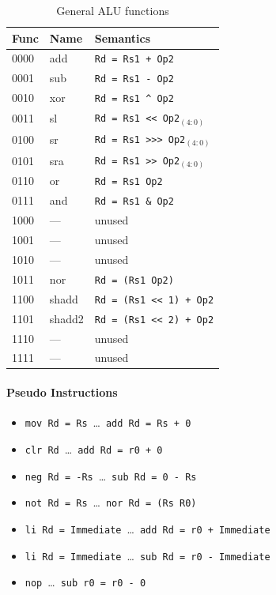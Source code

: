 \documentclass[a4paper,fontsize=10pt,twoside,DIV15,BCOR12mm,headinclude=true,footinclude=false,pagesize,bibtotoc]{scrbook}
\newcommand{\XOR}{\textasciicircum\xspace}
\newcommand{\OR}{\textbar\xspace}
\newcommand{\AND}{\&\xspace}
\newcommand{\NOT}{\texttildelow}
\newcommand{\shl}{\textless$\!$\textless\xspace}
\newcommand{\shr}{\textgreater$\!$\textgreater$\!$\textgreater\xspace}
\newcommand{\ashr}{\textgreater$\!$\textgreater\xspace}
\begin{document}
\begin{table}[hb]
  \centering
  \begin{tabular}{lll}
    \toprule
    Func & Name   & Semantics \\
    \midrule
    0000 & add    & \texttt{Rd = Rs1 + Op2} \\
    0001 & sub    & \texttt{Rd = Rs1 - Op2} \\
    0010 & xor    & \texttt{Rd = Rs1 \XOR Op2} \\
    0011 & sl     & \texttt{Rd = Rs1 \shl Op2$_{(4:0)}$} \\
    0100 & sr     & \texttt{Rd = Rs1 \shr Op2$_{(4:0)}$} \\
    0101 & sra    & \texttt{Rd = Rs1 \ashr Op2$_{(4:0)}$} \\
    0110 & or     & \texttt{Rd = Rs1 \OR Op2} \\
    0111 & and    & \texttt{Rd = Rs1 \AND Op2} \\
    \cmidrule{1-3}
    1000 & ---	& unused \\
    1001 & ---    & unused \\
    1010 & ---    & unused \\
    1011 & nor    & \texttt{Rd = \NOT (Rs1 \OR Op2)} \\
    1100 & shadd  & \texttt{Rd = (Rs1 \shl 1) + Op2} \\
    1101 & shadd2 & \texttt{Rd = (Rs1 \shl 2) + Op2} \\
    1110 & ---    & unused \\
    1111 & ---    & unused \\
    \bottomrule
  \end{tabular}
  \caption{General ALU functions}
  \label{tab:alufunc}
\end{table}

\paragraph{Pseudo Instructions}
\begin{itemize}
  \item \texttt{mov Rd = Rs}~\dots~\texttt{add Rd = Rs + 0}
  \item \texttt{clr Rd}~\dots~\texttt{add Rd = r0 + 0}
  \item \texttt{neg Rd = -Rs}~\dots~\texttt{sub Rd = 0 - Rs}
  \item \texttt{not Rd = \NOT Rs}~\dots~\texttt{nor Rd = \NOT (Rs \OR R0)}
  \item \texttt{li Rd = Immediate}~\dots~\texttt{add Rd = r0 + Immediate}
  \item \texttt{li Rd = Immediate}~\dots~\texttt{sub Rd = r0 - Immediate}
  \item \texttt{nop}~\dots~\texttt{sub r0 = r0 - 0}
\end{itemize}
\end{document}
